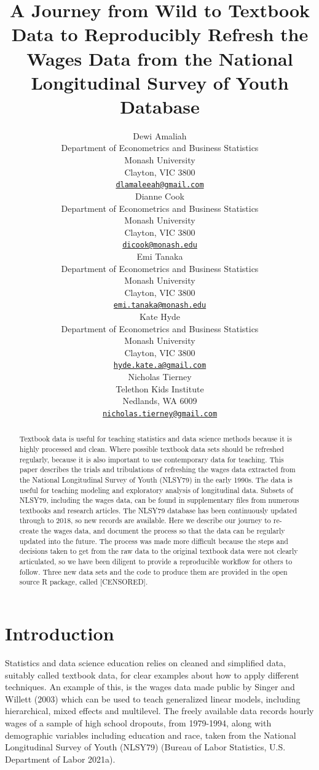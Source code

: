 \documentclass{article}
\title{A Journey from Wild to Textbook Data to Reproducibly Refresh the Wages Data from the National Longitudinal Survey of Youth Database}
\author{
    Dewi Amaliah
   \\
    Department of Econometrics and Business Statistics \\
    Monash University \\
  Clayton, VIC 3800 \\
  \texttt{\href{mailto:dlamaleeah@gmail.com}{\nolinkurl{dlamaleeah@gmail.com}}} \\
   \And
    Dianne Cook
   \\
    Department of Econometrics and Business Statistics \\
    Monash University \\
  Clayton, VIC 3800 \\
  \texttt{\href{mailto:dicook@monash.edu}{\nolinkurl{dicook@monash.edu}}} \\
   \And
    Emi Tanaka
   \\
    Department of Econometrics and Business Statistics \\
    Monash University \\
  Clayton, VIC 3800 \\
  \texttt{\href{mailto:emi.tanaka@monash.edu}{\nolinkurl{emi.tanaka@monash.edu}}} \\
   \And
    Kate Hyde
   \\
    Department of Econometrics and Business Statistics \\
    Monash University \\
  Clayton, VIC 3800 \\
  \texttt{\href{mailto:hyde.kate.a@gmail.com}{\nolinkurl{hyde.kate.a@gmail.com}}} \\
   \And
    Nicholas Tierney
   \\
    Telethon Kids Institute \\
  Nedlands, WA 6009 \\
  \texttt{\href{mailto:nicholas.tierney@gmail.com}{\nolinkurl{nicholas.tierney@gmail.com}}} \\
  }
\begin{document}
\maketitle

\def\tightlist{}


\begin{abstract}
Textbook data is useful for teaching statistics and data science methods because it is highly processed and clean. Where possible textbook data sets should be refreshed regularly, because it is also important to use contemporary data for teaching. This paper describes the trials and tribulations of refreshing the wages data extracted from the National Longitudinal Survey of Youth (NLSY79) in the early 1990s. The data is useful for teaching modeling and exploratory analysis of longitudinal data. Subsets of NLSY79, including the wages data, can be found in supplementary files from numerous textbooks and research articles. The NLSY79 database has been continuously updated through to 2018, so new records are available. Here we describe our journey to re-create the wages data, and document the process so that the data can be regularly updated into the future. The process was made more difficult because the steps and decisions taken to get from the raw data to the original textbook data were not clearly articulated, so we have been diligent to provide a reproducible workflow for others to follow. Three new data sets and the code to produce them are provided in the open source R package, called {[}CENSORED{]}.
\end{abstract}


\hypertarget{intro}{%
\section{Introduction}\label{intro}}

Statistics and data science education relies on cleaned and simplified data, suitably called textbook data, for clear examples about how to apply different techniques. An example of this, is the wages data made public by Singer and Willett (2003) which can be used to teach generalized linear models, including hierarchical, mixed effects and multilevel. The freely available data records hourly wages of a sample of high school dropouts, from 1979-1994, along with demographic variables including education and race, taken from the National Longitudinal Survey of Youth (NLSY79) (Bureau of Labor Statistics, U.S. Department of Labor 2021a).
\end{document}
